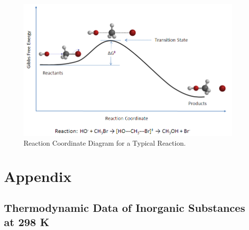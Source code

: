 \documentclass[
  9pt,
]{extbook}
\theoremstyle{definition}
\theoremstyle{definition}
\theoremstyle{definition}
\theoremstyle{remark}
\begin{document}
\begin{figure}

{\centering \includegraphics[width=0.7\linewidth]{./img/Rxn_coordinate_diagram_5} 

}

\caption{Reaction Coordinate Diagram for a Typical Reaction.}\label{fig:figk9}
\end{figure}

\renewcommand*{\standardstate}{{-\kern-6pt{\ominus}\kern-6pt-}}

\hypertarget{appendix}{%
\chapter{Appendix}\label{appendix}}

\hypertarget{thermodynamic-data-of-inorganic-substances-at-298-k}{%
\section{Thermodynamic Data of Inorganic Substances at 298 K}\label{thermodynamic-data-of-inorganic-substances-at-298-k}}

\tiny
\end{document}
